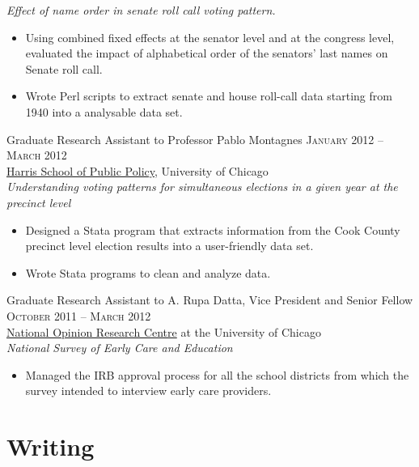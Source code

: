\documentclass[11pt]{article}
\begin{document}
\emph{Effect of name order in senate roll call voting pattern.}
\begin{itemize}
\item Using combined fixed effects at the senator level and at the
congress level, evaluated the impact of alphabetical order of the
senators' last names on Senate roll call.
\item Wrote Perl scripts to extract senate and house roll-call data starting from 1940 into a analysable data set.
\end{itemize}
\vspace{0.5em}
Graduate Research Assistant to Professor Pablo Montagnes \hfill
\textsc{January 2012 -- March 2012}\\
\href{http://harrisschool.uchicago.edu/directory/faculty/b-pablo_montagnes}{Harris School of Public Policy}, University of Chicago \\
\emph{Understanding voting patterns for simultaneous elections in a given year at the precinct level}
\begin{itemize}
\item Designed a Stata program that extracts information from the Cook
County precinct level election results into a user-friendly data
set.
\item Wrote Stata programs to clean and analyze data.
\end{itemize}
\vspace{0.5em}
Graduate Research Assistant to A. Rupa Datta, Vice President and
Senior Fellow  \hfill \textsc{October 2011 -- March 2012}\\
\href{http://www.norc.org/Research/Projects/Pages/national-survey-of-early-care-and-education.aspx}{National Opinion Research Centre} at the University of Chicago \\
\emph{National Survey of Early Care and Education}
\begin{itemize}
\item Managed the IRB approval process for all the school districts
from which the survey intended to interview early care providers.
\end{itemize}

\section{Writing}
\label{sec-3}
\end{document}
